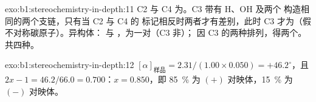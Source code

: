 \begin{solution}{exo:b1:stereochemistry-in-depth:11}
C2 与 C4 为。C3 带有 H、OH 及两个
构造相同的两个支链，只有当 C2 与 C4 的
标记相反时两者才有差别，此时 C3 才为（假不对称碳原子）。异构体：
 与 ，为一对（C3 非）；
 因 C3 的两种排列，得两个。共四种。
\end{solution}

\begin{solution}{exo:b1:stereochemistry-in-depth:12}
$[\alpha]_{\text{样品}} = 2.31/(1.00 \times 0.050) = +46.2^\circ$，且
$2x - 1 = 46.2/66.0 = 0.700$：$x = 0.850$，即 \qty{85}{\percent} 为
$(+)$ 对映体，\qty{15}{\percent} 为 $(-)$ 对映体。
\end{solution}

